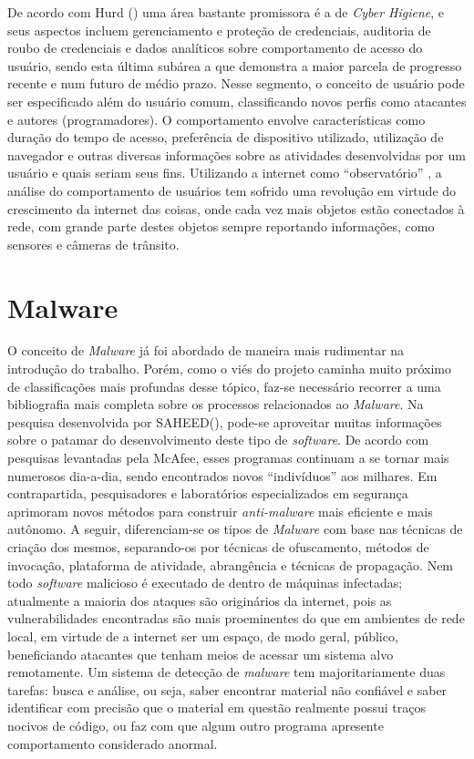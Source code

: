 De acordo com Hurd (\citeyear{hurd15}) uma área bastante promissora é a de
\emph{Cyber Higiene}, e seus aspectos incluem gerenciamento e proteção de credenciais,
auditoria de roubo de credenciais e dados analíticos sobre comportamento de
acesso do usuário, sendo esta última subárea a que demonstra a maior parcela
de progresso recente e num futuro de médio prazo. Nesse segmento, o conceito
de usuário pode ser especificado além do usuário comum, classificando novos
perfis como atacantes e autores (programadores). O comportamento envolve
características como duração do tempo de acesso, preferência de dispositivo
utilizado, utilização de navegador e outras diversas informações sobre as
atividades desenvolvidas por um usuário e quais seriam seus fins. Utilizando a
internet como ``observatório'' , a análise do comportamento de
usuários tem sofrido uma revolução em virtude do crescimento da internet das
coisas, onde cada vez mais objetos estão conectados à rede, com grande parte
destes objetos sempre reportando informações, como sensores e câmeras de
trânsito.


\section{Malware}
\label{s.malware_01}

O conceito de \textit{Malware} já foi abordado de maneira mais rudimentar na introdução
do trabalho. Porém, como o viés do projeto caminha muito próximo de
classificações mais profundas desse tópico, faz-se necessário recorrer a uma bibliografia mais
completa sobre os processos relacionados ao \textit{Malware}. Na pesquisa desenvolvida
por SAHEED(\citeyear{saeed13}), pode-se aproveitar muitas informações sobre o
patamar do desenvolvimento deste tipo de \textit{software}. De acordo com pesquisas
levantadas pela McAfee, esses programas continuam a se tornar mais numerosos
dia-a-dia, sendo encontrados novos ``indivíduos'' aos milhares. Em
contrapartida, pesquisadores e laboratórios especializados em segurança
aprimoram novos métodos para construir \textit{anti-malware} mais eficiente e mais
autônomo. A seguir, diferenciam-se os tipos de \textit{Malware} com base nas técnicas de
criação dos mesmos, separando-os por técnicas de ofuscamento, métodos de
invocação, plataforma de atividade, abrangência e técnicas de propagação. Nem
todo \textit{software} malicioso é executado de dentro de máquinas infectadas;
atualmente a maioria dos ataques são originários da internet, pois as
vulnerabilidades encontradas são mais proeminentes do que em ambientes de rede
local, em virtude de a internet ser um espaço, de modo geral, público,
beneficiando atacantes que tenham meios de acessar um sistema alvo
remotamente. Um sistema de detecção de \textit{malware} tem majoritariamente duas
tarefas: busca e análise, ou seja, saber encontrar material não confiável e
saber identificar com precisão que o material em questão realmente possui
traços nocivos de código, ou faz com que algum outro programa apresente
comportamento considerado anormal.

